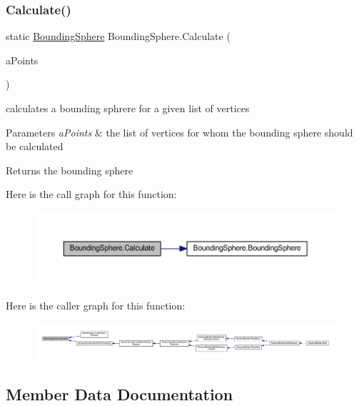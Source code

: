 \subsubsection{\texorpdfstring{Calculate()}{Calculate()}}
{\footnotesize\ttfamily static \mbox{\hyperlink{class_bounding_sphere}{Bounding\+Sphere}} Bounding\+Sphere.\+Calculate (\begin{DoxyParamCaption}\item[{I\+Enumerable$<$ Vector3 $>$}]{a\+Points }\end{DoxyParamCaption})\hspace{0.3cm}{\ttfamily [static]}}



calculates a bounding sphrere for a given list of vertices 


\begin{DoxyParams}{Parameters}
{\em a\+Points} & the list of vertices for whom the bounding sphere should be calculated\\
\hline
\end{DoxyParams}
\begin{DoxyReturn}{Returns}
the bounding sphere
\end{DoxyReturn}
Here is the call graph for this function\+:
\nopagebreak
\begin{figure}[H]
\begin{center}
\leavevmode
\includegraphics[width=350pt]{class_bounding_sphere_a29c277d13a701089666b94fabf3c87d6_cgraph}
\end{center}
\end{figure}
Here is the caller graph for this function\+:
\nopagebreak
\begin{figure}[H]
\begin{center}
\leavevmode
\includegraphics[width=350pt]{class_bounding_sphere_a29c277d13a701089666b94fabf3c87d6_icgraph}
\end{center}
\end{figure}


\subsection{Member Data Documentation}
\mbox{\label{class_bounding_sphere_a0996d0f450c5e7fcca8446ebbd8ddc20}} 
